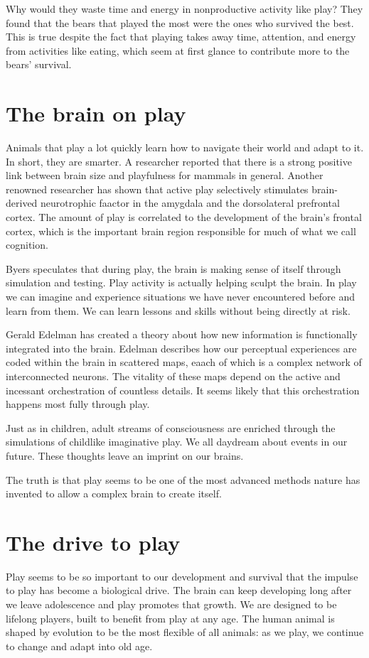 \documentclass[ebook,12pt,oneside,openany]{memoir}
\begin{document}
Why would they waste time and energy in nonproductive activity like play? 
They found that the bears that played the most were the ones who survived the best.
This is true despite the fact that playing takes away time, attention, and energy from activities like eating,
which seem at first glance to contribute more to the bears' survival.

\section{The brain on play}
Animals that play a lot quickly learn how to navigate their world and adapt to it.
In short, they are smarter. A researcher reported that there is a strong positive link
between brain size and playfulness for mammals in general.
Another renowned researcher has shown that active play selectively stimulates brain-derived neurotrophic faactor in the amygdala
and the dorsolateral prefrontal cortex. The amount of play is correlated to the development of the brain's frontal cortex, which is 
the important brain region responsible for much of what we call cognition.

Byers speculates that during play, the brain is making sense of itself through simulation and testing.
Play activity is actually helping sculpt the brain. 
In play we can imagine and experience situations we have never encountered before and learn from them.
We can learn lessons and skills without being directly at risk. 

Gerald Edelman has created a theory about how new information is functionally integrated into the brain.
Edelman describes how our perceptual experiences are coded within the brain in scattered maps, eaach of which is a complex network
of interconnected neurons.
The vitality of these maps depend on the active and incessant orchestration of countless details.
It seems likely that this orchestration happens most fully through play.

Just as in children, adult streams of consciousness are enriched through the simulations of childlike imaginative play.
We all daydream about events in our future. These thoughts leave an imprint on our brains.

The truth is that play seems to be one of the most advanced methods 
nature has invented to allow a complex brain to create itself.

\section{The drive to play}
Play seems to be so important to our development and survival that the impulse to play has become a biological drive.
The brain can keep developing long after we leave adolescence and play promotes that growth.
We are designed to be lifelong players, built to benefit from play at any age.
The human animal is shaped by evolution to be the most flexible of all animals: as we play,
we continue to change and adapt into old age. 
\end{document}
